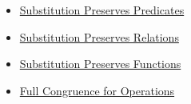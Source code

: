 \begin{dependencies}
\begin{itemize}
  \item \hyperref[prop:substitution-preserves-predicates]{Substitution Preserves Predicates}
  \item \hyperref[prop:substitution-preserves-relations-full]{Substitution Preserves Relations}
  \item \hyperref[prop:substitution-preserves-functions]{Substitution Preserves Functions}
  \item \hyperref[prop:substitution-preserves-operations-full]{Full Congruence for Operations}
\end{itemize}
\end{dependencies}
